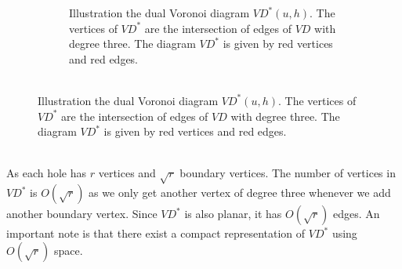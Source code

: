 \begin{figure}
\begin{subfigure}[b]{0.45\textwidth}
    \caption{Illustration the dual Voronoi diagram $VD^*(u,h)$. The vertices of
      $VD^*$ are the intersection of edges of $VD$ with degree three. The diagram $VD^*$
    is given by red vertices and red edges.\\ \\}
    \label{awvd2}
  \end{subfigure}
  \label{awvd}
\end{figure}
As each hole has $r$ vertices and
$\sqrt{r}$ boundary vertices. The number of vertices in $VD^*$ is $O(\sqrt{r})$ as we
only get another vertex of degree three whenever we add another boundary vertex. Since
$VD^*$ is also planar, it has $O(\sqrt{r})$ edges. An important
note is that there exist a compact representation of $VD^*$ using $O(\sqrt{r})$ space.
